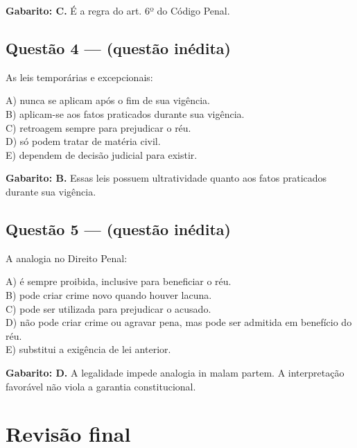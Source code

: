 \documentclass[11pt,a4paper]{article}
\begin{document}
\begin{alerta}
\textbf{Gabarito: C.} É a regra do art. 6º do Código Penal.
\end{alerta}

\subsection*{Questão 4 — (questão inédita)}

As leis temporárias e excepcionais:

A) nunca se aplicam após o fim de sua vigência. \\ B) aplicam-se aos fatos praticados durante sua vigência. \\ C) retroagem sempre para prejudicar o réu. \\ D) só podem tratar de matéria civil. \\ E) dependem de decisão judicial para existir.

\begin{alerta}
\textbf{Gabarito: B.} Essas leis possuem ultratividade quanto aos fatos praticados durante sua vigência.
\end{alerta}

\subsection*{Questão 5 — (questão inédita)}

A analogia no Direito Penal:

A) é sempre proibida, inclusive para beneficiar o réu. \\ B) pode criar crime novo quando houver lacuna. \\ C) pode ser utilizada para prejudicar o acusado. \\ D) não pode criar crime ou agravar pena, mas pode ser admitida em benefício do réu. \\ E) substitui a exigência de lei anterior.

\begin{alerta}
\textbf{Gabarito: D.} A legalidade impede analogia in malam partem. A interpretação favorável não viola a garantia constitucional.
\end{alerta}

\section*{Revisão final}
\end{document}
